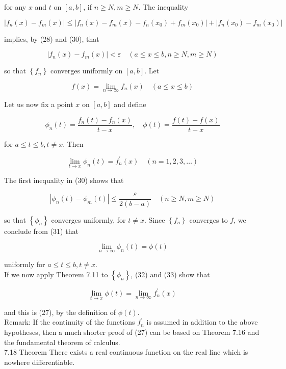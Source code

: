 \documentclass[10pt]{article}
\begin{document}
for any $x$ and $t$ on $[a, b]$, if $n \geq N, m \geq N$. The inequality

$$
\left|f_{n}(x)-f_{m}(x)\right| \leq\left|f_{n}(x)-f_{m}(x)-f_{n}\left(x_{0}\right)+f_{m}\left(x_{0}\right)\right|+\left|f_{n}\left(x_{0}\right)-f_{m}\left(x_{0}\right)\right|
$$

implies, by (28) and (30), that

$$
\left|f_{n}(x)-f_{m}(x)\right|<\varepsilon \quad(a \leq x \leq b, n \geq N, m \geq N)
$$

so that $\left\{f_{n}\right\}$ converges uniformly on $[a, b]$. Let

$$
f(x)=\lim _{n \rightarrow \infty} f_{n}(x) \quad(a \leq x \leq b)
$$

Let us now fix a point $x$ on $[a, b]$ and define


\begin{equation*}
\phi_{n}(t)=\frac{f_{n}(t)-f_{n}(x)}{t-x}, \quad \phi(t)=\frac{f(t)-f(x)}{t-x} \tag{31}
\end{equation*}


for $a \leq t \leq b, t \neq x$. Then


\begin{equation*}
\lim _{t \rightarrow x} \phi_{n}(t)=f_{n}^{\prime}(x) \quad(n=1,2,3, \ldots) \tag{32}
\end{equation*}


The first inequality in (30) shows that

$$
\left|\phi_{n}(t)-\phi_{m}(t)\right| \leq \frac{\varepsilon}{2(b-a)} \quad(n \geq N, m \geq N)
$$

so that $\left\{\phi_{n}\right\}$ converges uniformly, for $t \neq x$. Since $\left\{f_{n}\right\}$ converges to $f$, we conclude from (31) that


\begin{equation*}
\lim _{n \rightarrow \infty} \phi_{n}(t)=\phi(t) \tag{33}
\end{equation*}


uniformly for $a \leq t \leq b, t \neq x$.\\
If we now apply Theorem 7.11 to $\left\{\phi_{n}\right\}$, (32) and (33) show that

$$
\lim _{t \rightarrow x} \phi(t)=\lim _{n \rightarrow \infty} f_{n}^{\prime}(x)
$$

and this is (27), by the definition of $\phi(t)$.\\
Remark: If the continuity of the functions $f_{n}^{\prime}$ is assumed in addition to the above hypotheses, then a much shorter proof of (27) can be based on Theorem 7.16 and the fundamental theorem of calculus.\\
7.18 Theorem There exists a real continuous function on the real line which is nowhere differentiable.
\end{document}

